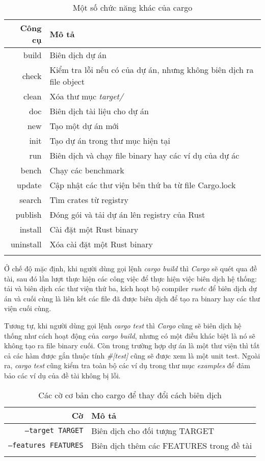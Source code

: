 \clearpage
\begin{longtable}{r|l}
\textbf{Công cụ} & \textbf{Mô tả} \\
\endhead
\midrule
build & Biên dịch dự án \\
check & Kiểm tra lỗi nếu có của dự án, nhưng không biên dịch ra file object \\
clean & Xóa thư mục \emph{target/} \\
doc & Biên dịch tài liệu cho dự án \\
new & Tạo một dự án mới \\
init & Tạo dự án trong thư mục hiện tại \\
run & Biên dịch và chạy file binary hay các ví dụ của dự ác \\
bench & Chạy các benchmark \\
update & Cập nhật các thư viện bên thứ ba từ file Cargo.lock \\
search & Tìm crates từ registry \\
publish & Đóng gói và tải dự án lên registry của Rust \\
install & Cài đặt một Rust binary \\
uninstall & Xóa cài đặt một Rust binary \\
\bottomrule
\caption{Một số chức năng khác của cargo}
\label{tbl:cargo_other_features}
\end{longtable}

Ở chế độ mặc định, khi người dùng gọi lệnh \emph{cargo build} thì \emph{Cargo} sẽ quét qua đề tài, sau đó lần lượt thực hiện các công việc để thực hiện việc biên dịch hệ thống: tải và biên dịch các thư viện thứ ba, kích hoạt bộ compiler \emph{rustc} để biên dịch dự án và cuối cùng là liên kết các file đã được biên dịch để tạo ra binary hay các thư viện cuối cùng.

Tương tự, khi người dùng gọi lệnh \emph{cargo test} thì \emph{Cargo} cũng sẽ biên dịch hệ thống như cách hoạt động của \emph{cargo build}, nhưng có một điều khác biệt là nó sẽ không tạo ra file binary cuối.
Còn trong trường hợp dự án là một thư viện thì tất cả các hàm được gắn thuộc tính \emph{\#[test]} cũng sẽ được xem là một unit test.
Ngoài ra, \emph{cargo test} cũng kiểm tra toàn bộ các ví dụ trong thư mục \emph{examples} để đảm bảo các ví dụ của đề tài không bị lỗi.

\begin{longtable}{r|l}
\textbf{Cờ} & \textbf{Mô tả} \\
\endhead
\midrule
\texttt{--target TARGET} & Biên dịch cho đối tượng TARGET \\
\texttt{--features FEATURES} & Biên dịch thêm các FEATURES trong đề tài \\
\bottomrule
\caption{Các cờ cơ bản cho cargo để thay đổi cách biên dịch}
\label{tbl:cargo_flags_example}
\end{longtable}

